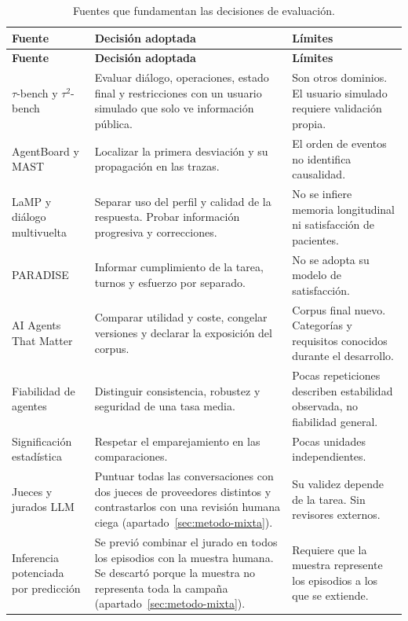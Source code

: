 \begin{longtable}{L{0.25\textwidth}L{0.38\textwidth}L{0.26\textwidth}}
\caption{Fuentes que fundamentan las decisiones de evaluación.}
\label{tab:fuentes-metodo}\\
\toprule
\textbf{Fuente} & \textbf{Decisión adoptada} & \textbf{Límites} \\
\midrule
\endfirsthead
\toprule
\textbf{Fuente} & \textbf{Decisión adoptada} & \textbf{Límites} \\
\midrule
\endhead
\(\tau\)-bench y \(\tau^2\)-bench \citep{yao2024taubench,barres2025tau2}
& Evaluar diálogo, operaciones, estado final y restricciones con un usuario simulado que solo ve información pública.
& Son otros dominios. El usuario simulado requiere validación propia. \\
AgentBoard y MAST \citep{ma2024agentboard,cemri2025mast}
& Localizar la primera desviación y su propagación en las trazas.
& El orden de eventos no identifica causalidad. \\
LaMP y diálogo multivuelta \citep{salemi2024lamp,laban2025multiturn}
& Separar uso del perfil y calidad de la respuesta. Probar información progresiva y correcciones.
& No se infiere memoria longitudinal ni satisfacción de pacientes. \\
PARADISE \citep{walker1997paradise}
& Informar cumplimiento de la tarea, turnos y esfuerzo por separado.
& No se adopta su modelo de satisfacción. \\
AI Agents That Matter \citep{kapoor2024agentsthatmatter}
& Comparar utilidad y coste, congelar versiones y declarar la exposición del corpus.
& Corpus final nuevo. Categorías y requisitos conocidos durante el desarrollo. \\
Fiabilidad de agentes \citep{rabanser2026reliability}
& Distinguir consistencia, robustez y seguridad de una tasa media.
& Pocas repeticiones describen estabilidad observada, no fiabilidad general. \\
Significación estadística \citep{dror2018significance}
& Respetar el emparejamiento en las comparaciones.
& Pocas unidades independientes. \\
Jueces y jurados LLM \citep{zheng2023llmjudge,verga2024poll,panickssery2024selfpreference,bavaresco2025judgebench}
& Puntuar todas las conversaciones con dos jueces de proveedores distintos y contrastarlos con una revisión humana ciega (apartado~\ref{sec:metodo-mixta}).
& Su validez depende de la tarea. Sin revisores externos. \\
Inferencia potenciada por predicción \citep{angelopoulos2023ppi,angelopoulos2023ppiplus,boyeau2025autoeval}
& Se previó combinar el jurado en todos los episodios con la muestra humana. Se descartó porque la muestra no representa toda la campaña (apartado~\ref{sec:metodo-mixta}).
& Requiere que la muestra represente los episodios a los que se extiende. \\
\bottomrule
\end{longtable}

